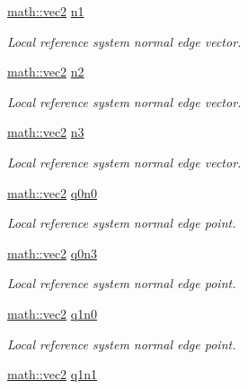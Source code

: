 \begin{DoxyCompactItemize}
\hyperlink{structphysim_1_1math_1_1vec2}{math\+::vec2} \hyperlink{classphysim_1_1geometry_1_1rectangle_a7bf283ce3fce024d2f41cc753390e329}{n1}
\begin{DoxyCompactList}\small\item\em Local reference system normal edge vector. \end{DoxyCompactList}\item 
\hyperlink{structphysim_1_1math_1_1vec2}{math\+::vec2} \hyperlink{classphysim_1_1geometry_1_1rectangle_a91dcc20f1b6ad5c5825b5198a57870ea}{n2}
\begin{DoxyCompactList}\small\item\em Local reference system normal edge vector. \end{DoxyCompactList}\item 
\hyperlink{structphysim_1_1math_1_1vec2}{math\+::vec2} \hyperlink{classphysim_1_1geometry_1_1rectangle_a09fc746421e9f033737733a0be27f204}{n3}
\begin{DoxyCompactList}\small\item\em Local reference system normal edge vector. \end{DoxyCompactList}\item 
\hyperlink{structphysim_1_1math_1_1vec2}{math\+::vec2} \hyperlink{classphysim_1_1geometry_1_1rectangle_a11af1da9a4015625a0afedfc1f164c93}{q0n0}
\begin{DoxyCompactList}\small\item\em Local reference system normal edge point. \end{DoxyCompactList}\item 
\hyperlink{structphysim_1_1math_1_1vec2}{math\+::vec2} \hyperlink{classphysim_1_1geometry_1_1rectangle_ace5a4da099f9b373cdaed495b3eae2ac}{q0n3}
\begin{DoxyCompactList}\small\item\em Local reference system normal edge point. \end{DoxyCompactList}\item 
\hyperlink{structphysim_1_1math_1_1vec2}{math\+::vec2} \hyperlink{classphysim_1_1geometry_1_1rectangle_a6d6723dad014720174e5f49e89d5f901}{q1n0}
\begin{DoxyCompactList}\small\item\em Local reference system normal edge point. \end{DoxyCompactList}\item 
\hyperlink{structphysim_1_1math_1_1vec2}{math\+::vec2} \hyperlink{classphysim_1_1geometry_1_1rectangle_a83a186daf42729bc03c2ab161237cdc0}{q1n1}

\end{DoxyCompactItemize}
